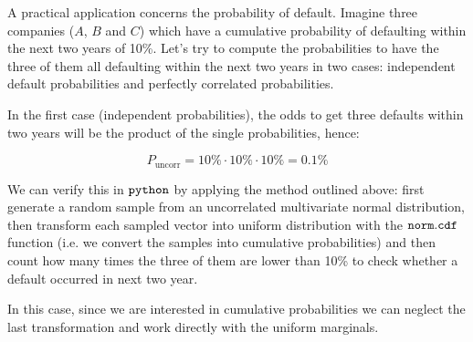 A practical application concerns the probability of default. 
Imagine three companies ($A$, $B$ and $C$) which have a
cumulative probability of defaulting within the next two years of 10\%.
Let's try to compute the probabilities to have the three of them all
defaulting within the next two years in two cases: independent default probabilities and perfectly correlated probabilities.

In the first case (independent probabilities), the
odds to get three defaults within two years will be the product
of the single probabilities, hence:

\[P_{\mathrm{uncorr}} = 10\% \cdot 10\% \cdot 10\% = 0.1 \%\]

We can verify this in \(\tt{python}\) by applying the method outlined above: first generate a random sample from an uncorrelated multivariate normal distribution, then transform each sampled vector into uniform distribution with the \(\tt{norm.cdf}\) function (i.e. we
convert the samples into cumulative probabilities) and then count how many times the
three of them are lower than 10\% to check whether a default occurred in next two year.

In this case, since we are interested in cumulative probabilities we can neglect the last transformation and work directly with the 
uniform marginals.

